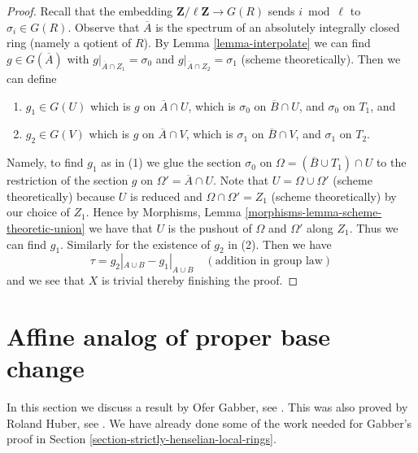 \begin{proof}
\medskip\noindent
Recall that the embedding $\mathbf{Z}/\ell \mathbf{Z} \to G(R)$
sends $i \bmod \ell$ to $\sigma_i \in G(R)$. Observe that $\overline{A}$
is the spectrum of an absolutely integrally closed ring (namely
a qotient of $R$). By
Lemma \ref{lemma-interpolate} we can find $g \in G(\overline{A})$ with
$g|_{\overline{A} \cap Z_1} = \sigma_0$ and
$g|_{\overline{A} \cap Z_2} = \sigma_1$ (scheme theoretically).
Then we can define
\begin{enumerate}
\item $g_1 \in G(U)$ which is $g$ on $\overline{A} \cap U$, which
is $\sigma_0$ on $\overline{B} \cap U$, and $\sigma_0$ on $T_1$, and
\item $g_2 \in G(V)$ which is $g$ on $\overline{A} \cap V$, which
is $\sigma_1$ on $\overline{B} \cap V$, and $\sigma_1$ on $T_2$.
\end{enumerate}
Namely, to find $g_1$ as in (1) we glue the section
$\sigma_0$ on $\Omega = (\overline{B} \cup T_1) \cap U$
to the restriction of the section $g$ on $\Omega' = \overline{A} \cap U$.
Note that $U = \Omega \cup \Omega'$ (scheme theoretically)
because $U$ is reduced and $\Omega \cap \Omega' = Z_1$ (scheme theoretically)
by our choice of $Z_1$. Hence by
Morphisms, Lemma \ref{morphisms-lemma-scheme-theoretic-union}
we have that $U$ is the pushout of $\Omega$ and $\Omega'$
along $Z_1$. Thus we can find $g_1$.
Similarly for the existence of $g_2$ in (2).
Then we have
$$
\tau = g_2|_{A \cup B} - g_1|_{A \cup B} \quad(\text{addition in group law})
$$
and we see that $X$ is trivial thereby finishing the proof.
\end{proof}




















\section{Affine analog of proper base change}
\label{section-gabber-affine-proper}

\noindent
In this section we discuss a result by Ofer Gabber, see
\cite{gabber-affine-proper}. This was also proved by Roland Huber, see
\cite{Huber-henselian}. We have already done some of the work needed
for Gabber's proof in Section \ref{section-strictly-henselian-local-rings}.

